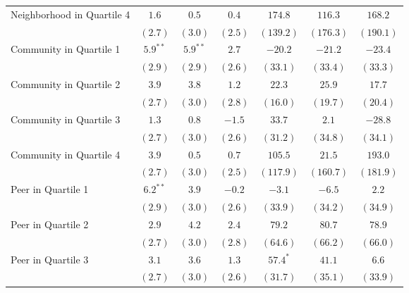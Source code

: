 \begin{center}
\begin{longtable}{l c c c c c c }
Neighborhood in Quartile 4 & $1.6$         & $0.5$         & $0.4$        & $174.8$       & $116.3$        & $168.2$        \\
                           & $(2.7)$       & $(3.0)$       & $(2.5)$      & $(139.2)$     & $(176.3)$      & $(190.1)$      \\
Community in Quartile 1    & $5.9^{**}$    & $5.9^{**}$    & $2.7$        & $-20.2$       & $-21.2$        & $-23.4$        \\
                           & $(2.9)$       & $(2.9)$       & $(2.6)$      & $(33.1)$      & $(33.4)$       & $(33.3)$       \\
Community in Quartile 2    & $3.9$         & $3.8$         & $1.2$        & $22.3$        & $25.9$         & $17.7$         \\
                           & $(2.7)$       & $(3.0)$       & $(2.8)$      & $(16.0)$      & $(19.7)$       & $(20.4)$       \\
Community in Quartile 3    & $1.3$         & $0.8$         & $-1.5$       & $33.7$        & $2.1$          & $-28.8$        \\
                           & $(2.7)$       & $(3.0)$       & $(2.6)$      & $(31.2)$      & $(34.8)$       & $(34.1)$       \\
Community in Quartile 4    & $3.9$         & $0.5$         & $0.7$        & $105.5$       & $21.5$         & $193.0$        \\
                           & $(2.7)$       & $(3.0)$       & $(2.5)$      & $(117.9)$     & $(160.7)$      & $(181.9)$      \\
Peer in Quartile 1         & $6.2^{**}$    & $3.9$         & $-0.2$       & $-3.1$        & $-6.5$         & $2.2$          \\
                           & $(2.9)$       & $(3.0)$       & $(2.6)$      & $(33.9)$      & $(34.2)$       & $(34.9)$       \\
Peer in Quartile 2         & $2.9$         & $4.2$         & $2.4$        & $79.2$        & $80.7$         & $78.9$         \\
                           & $(2.7)$       & $(3.0)$       & $(2.8)$      & $(64.6)$      & $(66.2)$       & $(66.0)$       \\
Peer in Quartile 3         & $3.1$         & $3.6$         & $1.3$        & $57.4^{*}$    & $41.1$         & $6.6$          \\
                           & $(2.7)$       & $(3.0)$       & $(2.6)$      & $(31.7)$      & $(35.1)$       & $(33.9)$       \\

\end{longtable}
\end{center}

